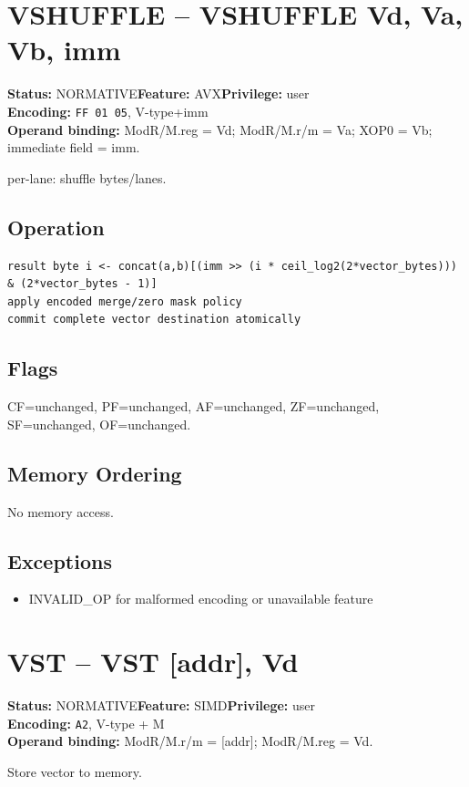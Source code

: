 \documentclass[10pt]{article}
\begin{document}
\section{VSHUFFLE -- VSHUFFLE Vd, Va, Vb, imm}
\textbf{Status:} NORMATIVE\quad \textbf{Feature:} AVX\quad \textbf{Privilege:} user\\
\textbf{Encoding:} \texttt{FF 01 05}, V-type+imm\\
\textbf{Operand binding:} ModR/M.reg = Vd; ModR/M.r/m = Va; XOP0 = Vb; immediate field = imm.

per-lane: shuffle bytes/lanes.

\subsection*{Operation}
\begin{lstlisting}
result byte i <- concat(a,b)[(imm >> (i * ceil_log2(2*vector_bytes))) & (2*vector_bytes - 1)]
apply encoded merge/zero mask policy
commit complete vector destination atomically
\end{lstlisting}
\subsection*{Flags}
CF=unchanged, PF=unchanged, AF=unchanged, ZF=unchanged, SF=unchanged, OF=unchanged.
\subsection*{Memory Ordering}
No memory access.
\subsection*{Exceptions}
\begin{itemize}
\item INVALID\_OP for malformed encoding or unavailable feature
\end{itemize}
\clearpage

\section{VST -- VST [addr], Vd}
\textbf{Status:} NORMATIVE\quad \textbf{Feature:} SIMD\quad \textbf{Privilege:} user\\
\textbf{Encoding:} \texttt{A2}, V-type + M\\
\textbf{Operand binding:} ModR/M.r/m = [addr]; ModR/M.reg = Vd.

Store vector to memory.
\end{document}
